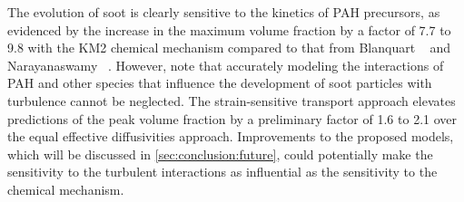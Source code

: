 The evolution of soot is clearly sensitive to the kinetics of PAH precursors, as evidenced by the increase in the maximum volume fraction by a factor of 7.7 to 9.8 with the KM2 chemical mechanism compared to that from Blanquart \etal~\cite{blanquart2009} and Narayanaswamy \etal~\cite{narayanaswamy2010}. However, note that accurately modeling the interactions of PAH and other species that influence the development of soot particles with turbulence cannot be neglected. The strain-sensitive transport approach elevates predictions of the peak volume fraction by a preliminary factor of 1.6 to 2.1 over the equal effective diffusivities approach. Improvements to the proposed models, which will be discussed in \cref{sec:conclusion:future}, could potentially make the sensitivity to the turbulent interactions as influential as the sensitivity to the chemical mechanism.



